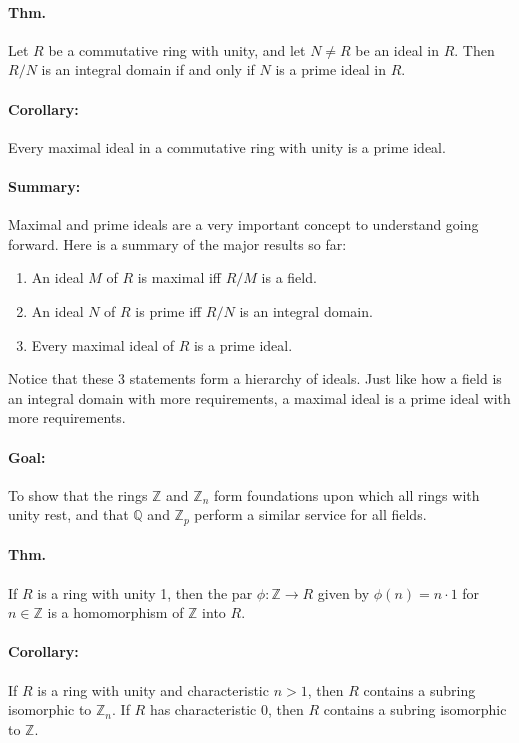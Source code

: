 \documentclass[10pt,a4paper]{article}
\begin{document}
\paragraph{Thm.} Let $R$ be a commutative ring with unity, and let $N \neq R$ be an ideal in $R$. Then $R/N$ is an integral domain if and only if $N$ is a prime ideal in $R$.

\paragraph{Corollary:} Every maximal ideal in a commutative ring with unity is a prime ideal.

\paragraph{Summary:} Maximal and prime ideals are a very important concept to understand going forward. Here is a summary of the major results so far:
\begin{enumerate}
\item An ideal $M$ of $R$ is maximal iff $R/M$ is a field.
\item An ideal $N$ of $R$ is prime iff $R/N$ is an integral domain.
\item Every maximal ideal of $R$ is a prime ideal.
\end{enumerate}
Notice that these 3 statements form a hierarchy of ideals. Just like how a field is an integral domain with more requirements, a maximal ideal is a prime ideal with more requirements.

\paragraph{Goal:} To show that the rings $\mathbb{Z}$ and $\mathbb{Z}_n$ form foundations upon which all rings with unity rest, and that $\mathbb{Q}$ and $\mathbb{Z}_p$ perform a similar service for all fields.

\paragraph{Thm.} If $R$ is a ring with unity 1, then the par $\phi: \mathbb{Z} \to R$ given by $\phi(n) = n \cdot 1$ for $n \in \mathbb{Z}$ is a homomorphism of $\mathbb{Z}$ into $R$.

\paragraph{Corollary:} If $R$ is a ring with unity and characteristic $n >1$, then $R$ contains a subring isomorphic to $\mathbb{Z}_n$. If $R$ has characteristic 0, then $R$ contains a subring isomorphic to $\mathbb{Z}$.
\end{document}
